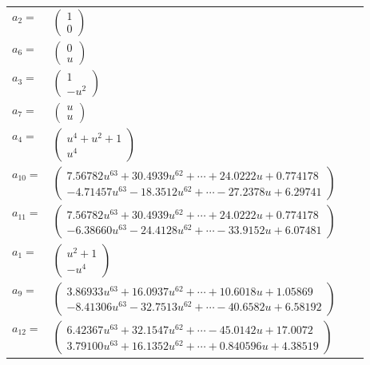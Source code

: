 \documentclass[1p]{elsarticle_modified}
\theoremstyle{definition}
\begin{document}
\begin{tabular}{m{7pt} m{180pt} m{7pt} m{180pt} }
\flushright $a_{2}=$&$\begin{pmatrix}1\\0\end{pmatrix}$ \\
\flushright $a_{6}=$&$\begin{pmatrix}0\\u\end{pmatrix}$ \\
\flushright $a_{3}=$&$\begin{pmatrix}1\\- u^2\end{pmatrix}$ \\
\flushright $a_{7}=$&$\begin{pmatrix}u\\u\end{pmatrix}$ \\
\flushright $a_{4}=$&$\begin{pmatrix}u^4+u^2+1\\u^4\end{pmatrix}$ \\
\flushright $a_{10}=$&$\begin{pmatrix}7.56782 u^{63}+30.4939 u^{62}+\cdots+24.0222 u+0.774178\\-4.71457 u^{63}-18.3512 u^{62}+\cdots-27.2378 u+6.29741\end{pmatrix}$ \\
\flushright $a_{11}=$&$\begin{pmatrix}7.56782 u^{63}+30.4939 u^{62}+\cdots+24.0222 u+0.774178\\-6.38660 u^{63}-24.4128 u^{62}+\cdots-33.9152 u+6.07481\end{pmatrix}$ \\
\flushright $a_{1}=$&$\begin{pmatrix}u^2+1\\- u^4\end{pmatrix}$ \\
\flushright $a_{9}=$&$\begin{pmatrix}3.86933 u^{63}+16.0937 u^{62}+\cdots+10.6018 u+1.05869\\-8.41306 u^{63}-32.7513 u^{62}+\cdots-40.6582 u+6.58192\end{pmatrix}$ \\
\flushright $a_{12}=$&$\begin{pmatrix}6.42367 u^{63}+32.1547 u^{62}+\cdots-45.0142 u+17.0072\\3.79100 u^{63}+16.1352 u^{62}+\cdots+0.840596 u+4.38519\end{pmatrix}$ \\

\end{tabular}
\end{document}
